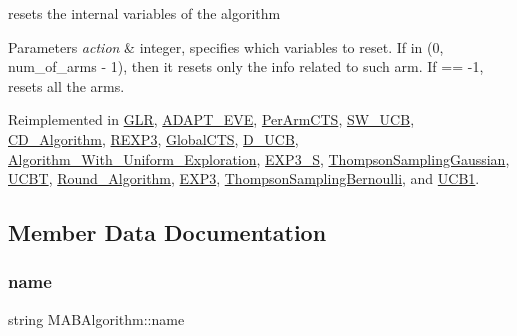 resets the internal variables of the algorithm 


\begin{DoxyParams}{Parameters}
{\em action} & integer, specifies which variables to reset. If in (0, num\+\_\+of\+\_\+arms -\/ 1), then it resets only the info related to such arm. If == -\/1, resets all the arms. \\
\hline
\end{DoxyParams}


Reimplemented in \mbox{\hyperlink{class_g_l_r_ad6c979e855b56e80ecfc54c8c93f035e}{G\+LR}}, \mbox{\hyperlink{class_a_d_a_p_t___e_v_e_aa89f094cbcba01accada672f0924a5f3}{A\+D\+A\+P\+T\+\_\+\+E\+VE}}, \mbox{\hyperlink{class_per_arm_c_t_s_ae5f8998bfb68b4a9cbdea7bca34f5cbe}{Per\+Arm\+C\+TS}}, \mbox{\hyperlink{class_s_w___u_c_b_afbbe9a17cc00402d2487260b530bbee2}{S\+W\+\_\+\+U\+CB}}, \mbox{\hyperlink{class_c_d___algorithm_a493e6eaafb4ab105c94e9e4c33143d39}{C\+D\+\_\+\+Algorithm}}, \mbox{\hyperlink{class_r_e_x_p3_ad99a97c07f75addc64e612774de81307}{R\+E\+X\+P3}}, \mbox{\hyperlink{class_global_c_t_s_a1e2c899b85ec7adf92a28ac758f556b5}{Global\+C\+TS}}, \mbox{\hyperlink{class_d___u_c_b_a454ffcd1e17989f0b049790cfc5fc515}{D\+\_\+\+U\+CB}}, \mbox{\hyperlink{class_algorithm___with___uniform___exploration_a96b0df2a59099ba8b4cc83f21b407642}{Algorithm\+\_\+\+With\+\_\+\+Uniform\+\_\+\+Exploration}}, \mbox{\hyperlink{class_e_x_p3___s_a70bfd4fc19a73ab7d2903672c36b2765}{E\+X\+P3\+\_\+S}}, \mbox{\hyperlink{class_thompson_sampling_gaussian_a847a421af9da4c81c10c395ebde1d8c8}{Thompson\+Sampling\+Gaussian}}, \mbox{\hyperlink{class_u_c_b_t_a4830934c071870d6f8680f90a247f9a7}{U\+C\+BT}}, \mbox{\hyperlink{class_round___algorithm_ae2c21984dbd89f5ba1a4f530472cf7f7}{Round\+\_\+\+Algorithm}}, \mbox{\hyperlink{class_e_x_p3_a30530aa50cd991eda2f9f2f170b92d0e}{E\+X\+P3}}, \mbox{\hyperlink{class_thompson_sampling_bernoulli_abb2e2c252333090ac1bd63e4297e99ba}{Thompson\+Sampling\+Bernoulli}}, and \mbox{\hyperlink{class_u_c_b1_aa426545f69a7e168ffcdcc3c9e8cd490}{U\+C\+B1}}.



\subsection{Member Data Documentation}
\mbox{\label{class_m_a_b_algorithm_a77b10ecc4b49d519c557f65358167b82}} 
\subsubsection{\texorpdfstring{name}{name}}
{\footnotesize\ttfamily string M\+A\+B\+Algorithm\+::name}

